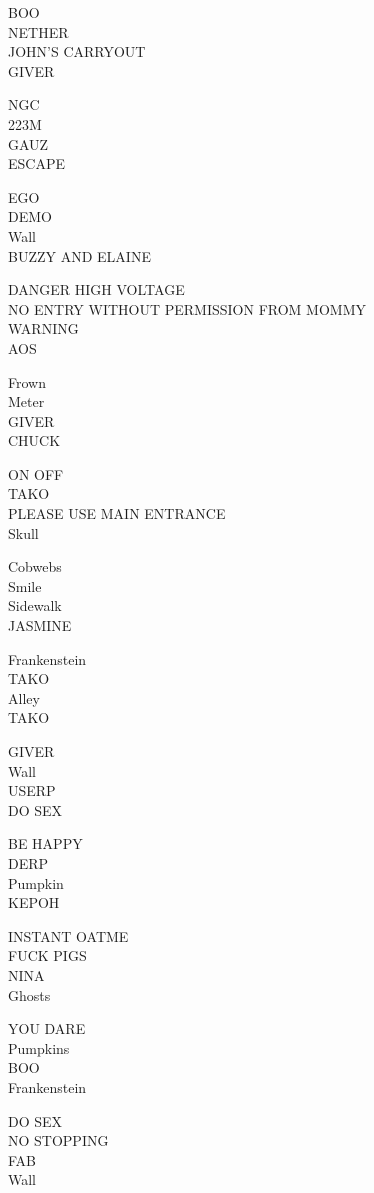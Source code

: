 \documentclass[10pt,letterpaper]{article}
\begin{document}
BOO\\
NETHER\\
JOHN'S CARRYOUT\\
GIVER

NGC\\
223M\\
GAUZ\\
ESCAPE

EGO\\
DEMO\\
Wall\\
BUZZY AND ELAINE

DANGER HIGH VOLTAGE\\
NO ENTRY WITHOUT PERMISSION FROM MOMMY\\
WARNING\\
AOS

Frown\\
Meter\\
GIVER\\
CHUCK

ON OFF\\
TAKO\\
PLEASE USE MAIN ENTRANCE\\
Skull

Cobwebs\\
Smile\\
Sidewalk\\
JASMINE

Frankenstein\\
TAKO\\
Alley\\
TAKO

GIVER\\
Wall\\
USERP\\
DO SEX

BE HAPPY\\
DERP\\
Pumpkin\\
KEPOH

INSTANT OATME\\
FUCK PIGS\\
NINA\\
Ghosts

YOU DARE\\
Pumpkins\\
BOO\\
Frankenstein

DO SEX\\
NO STOPPING\\
FAB\\
Wall
\end{document}
